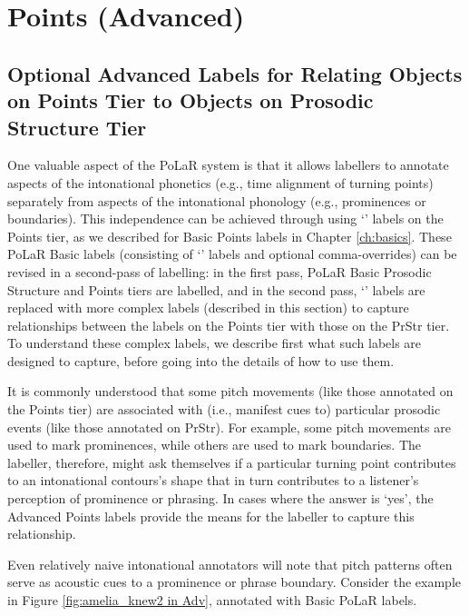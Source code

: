 \documentclass[11pt, twoside]{memoir}
\def\polar#1{{\relsize{-.5}\fontspec[Mapping=tex-text]{Roboto Mono}{#1}}}
\def\polarquot#1{‘\polar{#1}’}
\begin{document}
\section{Points (Advanced)}\label{sec:points-advanced}

\subsection{Optional Advanced Labels for Relating Objects on Points Tier to Objects on Prosodic Structure Tier}\label{sec:optional-advanced-labels-for-relating-points-tier-objects-to-prosodic-structure-tier-objects}

One valuable aspect of the PoLaR system is that it allows labellers to annotate aspects of the intonational phonetics (e.g., time alignment of turning points) separately from aspects of the intonational phonology (e.g., prominences or boundaries). This independence can be achieved through using \polarquot{0} labels on the Points tier, as we described for Basic Points labels in Chapter \ref{ch:basics}. These PoLaR Basic labels (consisting of \polarquot{0} labels and optional comma-overrides) can be revised in a second-pass of labelling: in the first pass, PoLaR Basic Prosodic Structure and Points tiers are labelled, and in the second pass, \polarquot{0} labels are replaced with more complex labels (described in this section) to capture relationships between the  labels on the Points tier with those on the PrStr tier. To understand these complex labels, we describe first what such labels are designed to capture, before going into the details of how to use them.

It is commonly understood that some pitch movements (like those annotated on the Points tier) are associated with (i.e., manifest cues to) particular prosodic events (like those annotated on PrStr). For example, some pitch movements are used to mark prominences, while others are used to mark boundaries. The labeller, therefore, might ask themselves if a particular turning point contributes to an intonational contours’s shape that in turn contributes to a listener’s perception of prominence or phrasing. In cases where the answer is ‘yes’, the Advanced Points labels provide the means for the labeller to capture this relationship.

Even relatively naive intonational annotators will note that pitch patterns often serve as acoustic cues to a prominence or phrase boundary. Consider the example in Figure \ref{fig:amelia_knew2 in Adv}, annotated with Basic PoLaR labels.
\end{document}
